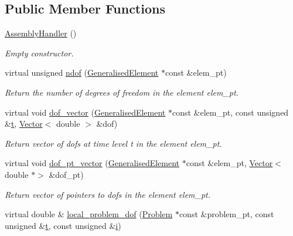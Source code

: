 \subsection*{Public Member Functions}
\begin{DoxyCompactItemize}
\item 
\hyperlink{classoomph_1_1AssemblyHandler_af3ab79744dce0b50370defdbf7981691}{Assembly\+Handler} ()
\begin{DoxyCompactList}\small\item\em Empty constructor. \end{DoxyCompactList}\item 
virtual unsigned \hyperlink{classoomph_1_1AssemblyHandler_a09213be8f4aa009e0366460a7ed78e68}{ndof} (\hyperlink{classoomph_1_1GeneralisedElement}{Generalised\+Element} $\ast$const \&elem\+\_\+pt)
\begin{DoxyCompactList}\small\item\em Return the number of degrees of freedom in the element elem\+\_\+pt. \end{DoxyCompactList}\item 
virtual void \hyperlink{classoomph_1_1AssemblyHandler_abfd15243fce76ce8f1ea0248c700a3f4}{dof\+\_\+vector} (\hyperlink{classoomph_1_1GeneralisedElement}{Generalised\+Element} $\ast$const \&elem\+\_\+pt, const unsigned \&\hyperlink{cfortran_8h_af6f0bd3dc13317f895c91323c25c2b8f}{t}, \hyperlink{classoomph_1_1Vector}{Vector}$<$ double $>$ \&dof)
\begin{DoxyCompactList}\small\item\em Return vector of dofs at time level t in the element elem\+\_\+pt. \end{DoxyCompactList}\item 
virtual void \hyperlink{classoomph_1_1AssemblyHandler_ac4ea8b24799a4d71e74c195ba85500ee}{dof\+\_\+pt\+\_\+vector} (\hyperlink{classoomph_1_1GeneralisedElement}{Generalised\+Element} $\ast$const \&elem\+\_\+pt, \hyperlink{classoomph_1_1Vector}{Vector}$<$ double $\ast$$>$ \&dof\+\_\+pt)
\begin{DoxyCompactList}\small\item\em Return vector of pointers to dofs in the element elem\+\_\+pt. \end{DoxyCompactList}\item 
virtual double \& \hyperlink{classoomph_1_1AssemblyHandler_ab61559fc5df46871c1eebd103f7bf08b}{local\+\_\+problem\+\_\+dof} (\hyperlink{classoomph_1_1Problem}{Problem} $\ast$const \&problem\+\_\+pt, const unsigned \&\hyperlink{cfortran_8h_af6f0bd3dc13317f895c91323c25c2b8f}{t}, const unsigned \&\hyperlink{cfortran_8h_adb50e893b86b3e55e751a42eab3cba82}{i})
$$
\end{DoxyCompactItemize}
